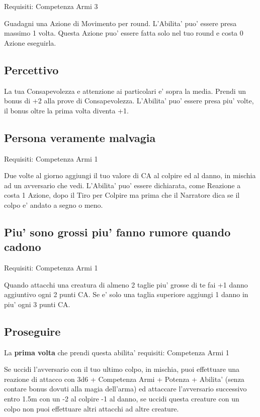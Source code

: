 \documentclass[a4paper,11pt,twoside,openany]{dndbook}
\begin{document}
Requisiti: Competenza Armi 3

Guadagni una Azione di Movimento per round. L'Abilita' puo' essere presa massimo 1 volta. Questa Azione puo' essere fatta solo nel tuo round e costa 0 Azione eseguirla.

\subsection{Percettivo}

La tua Consapevolezza e attenzione ai particolari e' sopra la media.
Prendi un bonus di +2 alla prove di Consapevolezza. L'Abilita' puo'
essere presa piu' volte, il bonus oltre la prima volta diventa +1.

\subsection{Persona veramente malvagia}

Requisiti: Competenza Armi 1

Due volte al giorno aggiungi il tuo valore di CA al colpire ed al danno, in mischia ad un avversario che vedi. L'Abilita' puo' essere dichiarata, come Reazione a costa 1 Azione, dopo il Tiro per Colpire ma prima che il Narratore dica se il colpo e' andato a segno o meno.

\subsection{Piu' sono grossi piu' fanno rumore quando cadono}

Requisiti: Competenza Armi 1

Quando attacchi una creatura di almeno 2 taglie piu' grosse di te fai +1 danno aggiuntivo ogni 2 punti CA. Se e' solo una taglia superiore aggiungi 1 danno in piu' ogni 3 punti CA.

\subsection{Proseguire}

La \textbf{prima volta} che prendi questa abilita' requisiti: Competenza Armi 1

Se uccidi l'avversario con il tuo ultimo colpo, in mischia, puoi effettuare una reazione di attacco con 3d6 + Competenza Armi + Potenza + Abilita' (senza contare bonus dovuti alla magia dell'arma) ed attaccare l'avversario successivo entro 1.5m con un -2 al colpire -1 al danno, se uccidi questa creature con un colpo non puoi effettuare altri attacchi ad altre creature.
\end{document}
